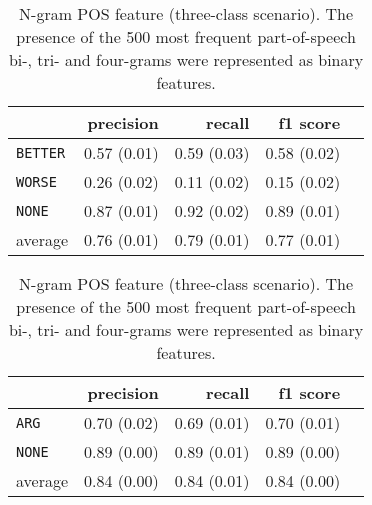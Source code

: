 	\begin{table}[h] 
		\centering 
		\caption{N-gram POS feature (three-class scenario). The presence of the 500 most frequent part-of-speech bi-, tri- and four-grams were represented as binary features.} 
		\label{  }
		\begin{tabular}{@{}lrrrr@{}}
			\toprule
			        & precision                & recall                   & f1 score                 \\ \midrule 
			\texttt{BETTER}  & 0.57 \scriptsize{(0.01)} & 0.59 \scriptsize{(0.03)} & 0.58 \scriptsize{(0.02)} \\ 
			\texttt{WORSE}   & 0.26 \scriptsize{(0.02)} & 0.11 \scriptsize{(0.02)} & 0.15 \scriptsize{(0.02)} \\ 
			\texttt{NONE}    & 0.87 \scriptsize{(0.01)} & 0.92 \scriptsize{(0.02)} & 0.89 \scriptsize{(0.01)} \\ 
			average & 0.76 \scriptsize{(0.01)} & 0.79 \scriptsize{(0.01)} & 0.77 \scriptsize{(0.01)} \\ 
			\bottomrule
		\end{tabular}
	\end{table}
	
	\begin{table}[h] 
		\centering 
		\caption{N-gram POS feature (three-class scenario). The presence of the 500 most frequent part-of-speech bi-, tri- and four-grams were represented as binary features.} 
		\label{  }
		\begin{tabular}{@{}lrrrr@{}}
			\toprule
			        & precision                & recall                   & f1 score                 \\ \midrule 
			\texttt{ARG}     & 0.70 \scriptsize{(0.02)} & 0.69 \scriptsize{(0.01)} & 0.70 \scriptsize{(0.01)} \\ 
			\texttt{NONE}    & 0.89 \scriptsize{(0.00)} & 0.89 \scriptsize{(0.01)} & 0.89 \scriptsize{(0.00)} \\ 
			average & 0.84 \scriptsize{(0.00)} & 0.84 \scriptsize{(0.01)} & 0.84 \scriptsize{(0.00)} \\ 
			\bottomrule
		\end{tabular}
	\end{table}
	

	

